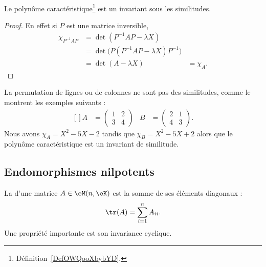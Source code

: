 \begin{lemma}
	Le polynôme caractéristique\footnote{Définition~\ref{DefOWQooXbybYD}.} est un invariant sous les similitudes.
\end{lemma}

\begin{proof}
	En effet si \( P\) est une matrice inversible,
	\begin{subequations}
		\begin{align}
			\chi_{P^{-1}AP} & = \det(P^{-1}AP-\lambda X)                    \\
			                & = \det\big( P(P^{-1}AP-\lambda X)P^{-1} \big) \\
			                & = \det(A-\lambda X)
			                & = \chi_A.
		\end{align}
	\end{subequations}
\end{proof}

La permutation de lignes ou de colonnes ne sont pas des similitudes, comme le montrent les exemples suivants :
\begin{equation}
	\begin{aligned}[]
		A & =\begin{pmatrix}
			1 & 2 \\
			3 & 4
		\end{pmatrix}  &
		B & =\begin{pmatrix}
			2 & 1 \\
			4 & 3
		\end{pmatrix}.
	\end{aligned}
\end{equation}
Nous avons \( \chi_A=X^2-5X-2\) tandis que \( \chi_B=X^2-5X+2\) alors que le polynôme caractéristique est un invariant de similitude.

\subsection{Endomorphismes nilpotents}

La  d'une matrice \( A\in \eM(n,\eK)\) est la somme de ses éléments diagonaux :
\begin{equation}
	\tr(A)=\sum_{i=1}^nA_{ii}.
\end{equation}
Une propriété importante est son invariance cyclique.

